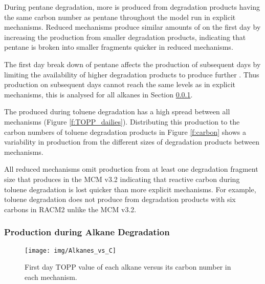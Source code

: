 During pentane degradation, more  is produced from degradation products having the same carbon number as pentane throughout the model run in explicit mechanisms.
Reduced mechanisms produce similar amounts of  on the first day by increasing the  production from smaller degradation products, indicating that pentane is broken into smaller fragments quicker in reduced mechanisms.  

The first day break down of pentane affects the  production of subsequent days by limiting the availability of higher degradation products to produce further .
Thus  production on subsequent days cannot reach the same levels as in explicit mechanisms, this is analysed for all alkanes in Section \ref{sss:alkanes}.

The  produced during toluene degradation has a high spread between all mechanisms (Figure \ref{f:TOPP_dailies}).
Distributing this  production to the carbon numbers of toluene degradation products in Figure \ref{f:carbon} shows a variability in  production from the different sizes of degradation products between mechanisms.

All reduced mechanisms omit  production from at least one degradation fragment size that produces  in the MCM v3.2 indicating that reactive carbon during toluene degradation is lost quicker than more explicit mechanisms.
For example, toluene degradation does not produce  from degradation products with six carbons in RACM2 unlike the MCM v3.2.

%

\subsubsection[Ox Production during Alkane Degradation]{ Production during Alkane Degradation} \label{sss:alkanes}

\begin{figure}
    \centering
    \texttt{[image: img/Alkanes\_vs\_C]}
    \vspace{0mm}
    \caption{First day TOPP value of each alkane versus its carbon number in each mechanism.}
    \vspace{-4mm}
    \label{f:alkanes_C}
\end{figure}


